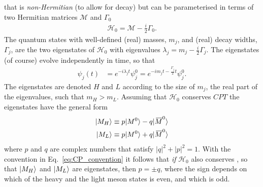  that is \emph{non-Hermitian} (to allow for decay) but can be parameterised in terms of two Hermitian matrices $\mathcal M$ and $\Gamma_0$
 \begin{align}
     \mathcal H_0 = \mathcal M - \frac{i}{2}\Gamma_0.
 \end{align}
 The quantum states with well-defined (real) masses, $m_j$, and (real) decay widths, $\Gamma_j$, are the two eigenstates of $\mathcal H_0$ with eigenvalues $\lambda_j = m_j - \frac{i}{2}\Gamma_j$. The eigenstates (of course) evolve independently in time, so that
 \begin{align}\label{eq:vac_time_dep}
     \psi_j(t) &= e^{-i\lambda_{j}t} \psi_{j}^0 =  e^{-im_{j}t -\frac{\Gamma_{j}}{2}t}\psi_{j}^0.
 \end{align}
 The eigenstates are denoted $H$ and $L$  according to the size of $m_j$, the real part of the eigenvalues, such that $m_H > m_L$. 
 Assuming that $\mathcal H_0$ conserves $CPT$ the eigenstates have the general form
 \begin{align}
 \begin{split}\label{eq:general_pq_form}
     |M_H\rangle &\equiv p |M^0\rangle - q |\kern 0.18em\overline{\kern -0.18em M}^0\rangle \\
     |M_L\rangle &\equiv p |M^0\rangle + q |\kern 0.18em\overline{\kern -0.18em M}^0\rangle 
 \end{split}
 \end{align}
where $p$ and $q$ are complex numbers that satisfy $|q|^2+|p|^2=1$.
With the convention in Eq.~\eqref{eq:CP_convention} it follows that \emph{if} $\mathcal H_0$ also conserves \CP, so that $|M_H\rangle$ and $|M_L\rangle$ are \CP eigenstates, then $p=\pm q$, where the sign depends on which of the heavy and the light meson states is \CP even, and which is \CP odd.



